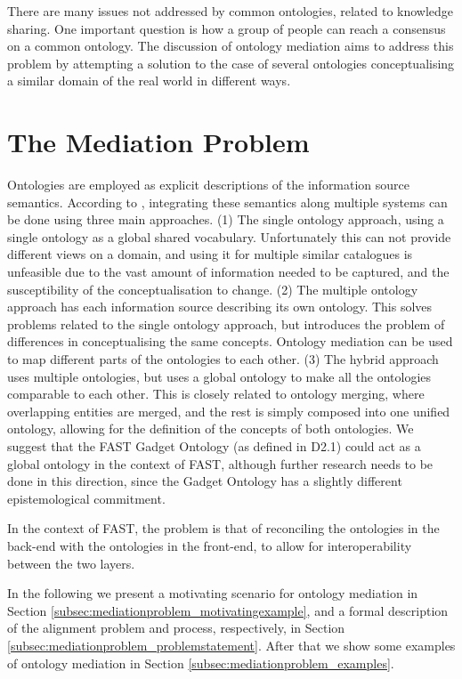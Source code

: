 There are many issues not addressed by common ontologies, related to
knowledge sharing. One important question is how a group of people can
reach a consensus on a common ontology. The discussion of ontology
mediation aims to address this problem by attempting a solution to the
case of several ontologies conceptualising a similar domain of the real
world in different ways.


\section{The Mediation Problem} %
\label{sec:mediationproblem}
Ontologies are employed as explicit descriptions of the information
source semantics. According to \cite{wache2001ontology_information_integration}, integrating these
semantics along multiple systems can be done using three main
approaches. (1) The single ontology approach, using a single ontology
as a global shared vocabulary. Unfortunately this can not provide
different views on a domain, and using it for multiple similar
catalogues is unfeasible due to the vast amount of information needed
to be captured, and the susceptibility of the conceptualisation to
change. (2) The multiple ontology approach has each information source
describing its own ontology. This solves problems related to the single
ontology approach, but introduces the problem of differences in
conceptualising the same concepts. Ontology mediation can be used to
map different parts of the ontologies to each other. (3) The hybrid
approach uses multiple ontologies, but uses a global ontology to make
all the ontologies comparable to each other. This is closely related to
ontology merging, where overlapping entities are merged, and the rest
is simply composed into one unified ontology, allowing for the
definition of the concepts of both ontologies. We suggest that the FAST
Gadget Ontology (as defined in D2.1) could act as a global ontology in
the context of FAST, although further research needs to be done in this
direction, since the Gadget Ontology has a slightly different
epistemological commitment. 

In the context of FAST, the problem is that of reconciling the
ontologies in the back-end with the ontologies in the front-end, to
allow for interoperability between the two layers. 

In the following we present a motivating scenario for ontology mediation
in Section \ref{subsec:mediationproblem_motivatingexample}, and a formal description of the alignment problem and
process, respectively, in Section \ref{subsec:mediationproblem_problemstatement}. After that we show some examples
of ontology mediation in Section \ref{subsec:mediationproblem_examples}.

